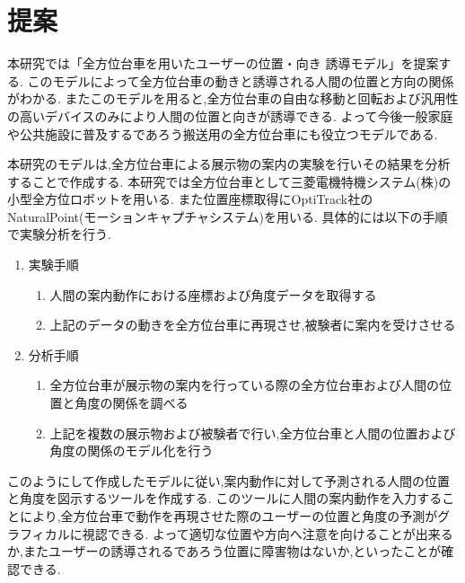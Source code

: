\chapter{提案}\label{chap:proporsal}

\par
本研究では「全方位台車を用いたユーザーの位置・向き 誘導モデル」を提案する.
このモデルによって全方位台車の動きと誘導される人間の位置と方向の関係がわかる.
またこのモデルを用ると,全方位台車の自由な移動と回転および汎用性の高いデバイスのみにより人間の位置と向きが誘導できる.
よって今後一般家庭や公共施設に普及するであろう搬送用の全方位台車にも役立つモデルである.
\par
本研究のモデルは,全方位台車による展示物の案内の実験を行いその結果を分析することで作成する.
本研究では全方位台車として三菱電機特機システム(株)の小型全方位ロボットを用いる.
また位置座標取得にOptiTrack社のNaturalPoint(モーションキャプチャシステム)を用いる.
具体的には以下の手順で実験分析を行う.

\begin{enumerate}
\item 実験手順
\begin{enumerate}
\item 人間の案内動作における座標および角度データを取得する
\item 上記のデータの動きを全方位台車に再現させ,被験者に案内を受けさせる
\end{enumerate}
\item 分析手順
\begin{enumerate}
\item 全方位台車が展示物の案内を行っている際の全方位台車および人間の位置と角度の関係を調べる
\item 上記を複数の展示物および被験者で行い,全方位台車と人間の位置および角度の関係のモデル化を行う
\end{enumerate}
\end{enumerate}



\par
このようにして作成したモデルに従い,案内動作に対して予測される人間の位置と角度を図示するツールを作成する.
このツールに人間の案内動作を入力することにより,全方位台車で動作を再現させた際のユーザーの位置と角度の予測がグラフィカルに視認できる.
よって適切な位置や方向へ注意を向けることが出来るか,またユーザーの誘導されるであろう位置に障害物はないか,といったことが確認できる.
